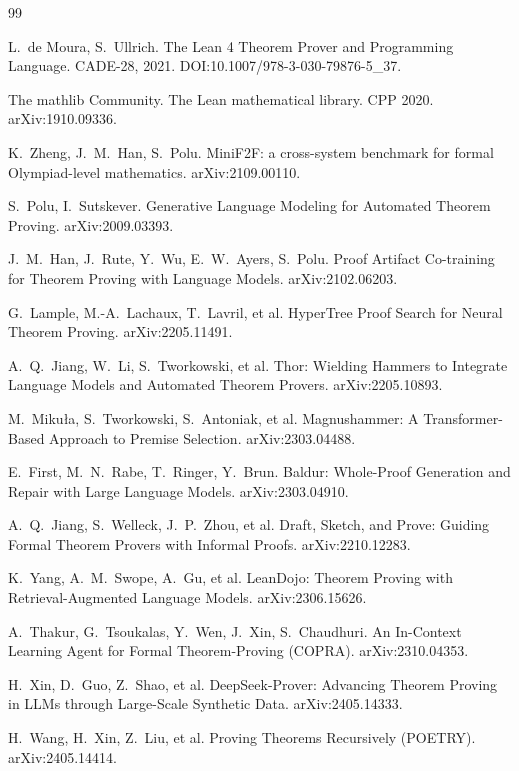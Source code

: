 \documentclass[UTF8,a4paper,11pt,fontset=windows]{ctexart}
\begin{document}
\begin{thebibliography}{99}
\small
\setlength{\itemsep}{0pt}

 L.~de Moura, S.~Ullrich. The Lean 4 Theorem Prover and Programming Language. CADE-28, 2021. DOI:10.1007/978-3-030-79876-5\_37.

 The mathlib Community. The Lean mathematical library. CPP 2020. arXiv:1910.09336.

 K.~Zheng, J.~M.~Han, S.~Polu. MiniF2F: a cross-system benchmark for formal Olympiad-level mathematics. arXiv:2109.00110.

 S.~Polu, I.~Sutskever. Generative Language Modeling for Automated Theorem Proving. arXiv:2009.03393.

 J.~M.~Han, J.~Rute, Y.~Wu, E.~W.~Ayers, S.~Polu. Proof Artifact Co-training for Theorem Proving with Language Models. arXiv:2102.06203.

 G.~Lample, M.-A.~Lachaux, T.~Lavril, et al. HyperTree Proof Search for Neural Theorem Proving. arXiv:2205.11491.

 A.~Q.~Jiang, W.~Li, S.~Tworkowski, et al. Thor: Wielding Hammers to Integrate Language Models and Automated Theorem Provers. arXiv:2205.10893.

 M.~Miku{\l}a, S.~Tworkowski, S.~Antoniak, et al. Magnushammer: A Transformer-Based Approach to Premise Selection. arXiv:2303.04488.

 E.~First, M.~N.~Rabe, T.~Ringer, Y.~Brun. Baldur: Whole-Proof Generation and Repair with Large Language Models. arXiv:2303.04910.

 A.~Q.~Jiang, S.~Welleck, J.~P.~Zhou, et al. Draft, Sketch, and Prove: Guiding Formal Theorem Provers with Informal Proofs. arXiv:2210.12283.

 K.~Yang, A.~M.~Swope, A.~Gu, et al. LeanDojo: Theorem Proving with Retrieval-Augmented Language Models. arXiv:2306.15626.

 A.~Thakur, G.~Tsoukalas, Y.~Wen, J.~Xin, S.~Chaudhuri. An In-Context Learning Agent for Formal Theorem-Proving (COPRA). arXiv:2310.04353.

 H.~Xin, D.~Guo, Z.~Shao, et al. DeepSeek-Prover: Advancing Theorem Proving in LLMs through Large-Scale Synthetic Data. arXiv:2405.14333.

 H.~Wang, H.~Xin, Z.~Liu, et al. Proving Theorems Recursively (POETRY). arXiv:2405.14414.


\end{thebibliography}
\end{document}
